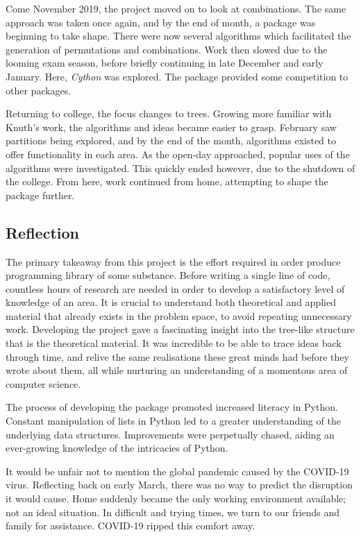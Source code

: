 \documentclass[12pt]{article}
\begin{document}
Come November 2019, the project moved on to look at combinations. The same approach was taken once again, and by the end of month, a package was beginning to take shape. There were now several algorithms which facilitated the generation of permutations and combinations. Work then slowed due to the looming exam season, before briefly continuing in late December and early January. Here, \textit{Cython} was explored. The package provided some competition to other packages.

Returning to college, the focus changes to trees. Growing more familiar with Knuth's work, the algorithms and ideas became easier to grasp. February saw partitions being explored, and by the end of the month, algorithms existed to offer functionality in each area. As the open-day approached, popular uses of the algorithms were investigated. This quickly ended however, due to the shutdown of the college. From here, work continued from home, attempting to shape the package further.

\subsection{Reflection}
The primary takeaway from this project is the effort required in order produce programming library of some substance. Before writing a single line of code, countless hours of research are needed in order to develop a satisfactory level of knowledge of an area. It is crucial to understand both theoretical and applied material that already exists in the problem space, to avoid repeating unnecessary work. Developing the project gave a fascinating insight into the tree-like structure that is the theoretical material. It was incredible to be able to trace ideas back through time, and relive the same realisations these great minds had before they wrote about them, all while nurturing an understanding of a momentous area of computer science.

The process of developing the package promoted increased literacy in Python. Constant manipulation of lists in Python led to a greater understanding of the underlying data structures. Improvements were perpetually chased, aiding an ever-growing knowledge of the intricacies of Python.

It would be unfair not to mention the global pandemic caused by the COVID-19 virus. Reflecting back on early March, there was no way to predict the disruption it would cause. Home suddenly became the only working environment available; not an ideal situation. In difficult and trying times, we turn to our friends and family for assistance. COVID-19 ripped this comfort away. 
\end{document}
